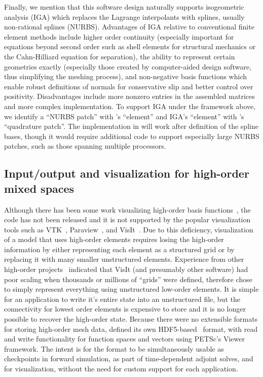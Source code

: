 Finally, we mention that this software design naturally supports isogeometric analysis (IGA) \cite{cottrell2009isogeometric} which replaces the Lagrange interpolants with splines, usually non-rational splines (NURBS).
Advantages of IGA relative to conventional finite element methods include higher order continuity (especially important for equations beyond second order such as shell elements for structural mechanics or the Cahn-Hilliard equation for separation), the ability to represent certain geometries exactly (especially those created by computer-aided design software, thus simplifying the meshing process), and non-negative basis functions which enable robust definitions of normals for conservative slip and better control over positivity.
Disadvantages include more nonzero entries in the assembled matrices and more complex implementation.
To support IGA under the framework above, we identify a ``NURBS patch'' with \Dohp's ``element'' and IGA's ``element'' with \Dohp's ``quadrature patch''.
The implementation in {\Dohp} will work after definition of the spline bases, though it would require additional code to support especially large NURBS patches, such as those spanning multiple processors.

\subsection{Input/output and visualization for high-order mixed spaces}
Although there has been some work visualizing high-order basis functions~\cite{schroeder2005framework,schroeder2006methods,ueffinger2010interactive}, the code has not been released and it is not supported by the popular visualization tools such as VTK~\cite{schroeder1998visualization}, Paraview~\cite{henderson2004paraview}, and VisIt~\cite{childs2006beyond}.
Due to this deficiency, visualization of a model that uses high-order elements requires losing the high-order information by either representing each element as a structured grid or by replacing it with many smaller unstructured elements.
Experience from other high-order projects~\cite{fischer2008nek5000} indicated that VisIt (and presumably other software) had poor scaling when thousands or millions of ``grids'' were defined, therefore {\Dohp} chose to simply represent everything using unstructured low-order elements.
It is simple for an application to write it's entire state into an unstructured file, but the connectivity for lowest order elements is expensive to store and it is no longer possible to recover the high-order state.
Because there were no extensible formats for storing high-order mesh data, {\Dohp} defined its own HDF5-based~\cite{hdf5} format, with read and write functionality for function spaces and vectors using PETSc's Viewer framework.
The intent is for the format to be simultaneously usable as checkpoints in forward simulation, as part of time-dependent adjoint solves, and for visualization, without the need for custom support for each application.

